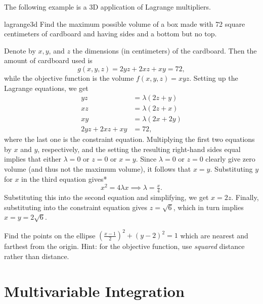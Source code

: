 \documentclass[svgnames]{watsonbook}
\begin{document}
  The following example is a 3D application of Lagrange multipliers. 
  
  \begin{example}{}{lagrange3d}
    Find the maximum possible volume of a box made with 72 square
    centimeters of cardboard and having sides and a bottom but no
    top. 
  \end{example}

  \begin{solution}
    Denote by $x,y$, and $z$ the dimensions (in centimeters) of the
    cardboard. Then the amount of cardboard used is
    \[
      g(x,y,z) = 2yz + 2xz + xy = 72, 
    \]
    while the objective function is the volume $f(x,y,z) =
    xyz$. Setting up the Lagrange equations, we get
    \begin{align*}
      yz &= \lambda(2z + y) \\
      xz &= \lambda(2z + x) \\
      xy &= \lambda(2x + 2y) \\
      2yz + 2xz + xy &= 72, 
    \end{align*}
    where the last one is the constraint equation. Multiplying the
    first two equations by $x$ and $y$, respectively, and the setting
    the resulting right-hand sides equal implies that either $\lambda
    = 0$ or $z= 0$ or  $x = y$. Since $\lambda = 0$ or $z = 0$ clearly
    give zero volume (and thus not the maximum volume), it follows
    that $x=y$. Substituting $y$ for $x$ in the third equation gives*
    \[
      x^2 = 4 \lambda x \implies \lambda = \tfrac{x}{4}. 
    \]
    Substituting this into the second equation and simplifying, we get
    $x = 2z$. Finally, substituting into the constraint equation gives
    $z = \sqrt{6}$, which in turn implies $x = y = 2\sqrt{6}$. 
  \end{solution}

  \begin{exercise}{}{}
    Find the points on the ellipse $\left(\frac{x - 1}{2}\right)^2 +
    (y-2)^2 = 1$ which are nearest and farthest from the origin. Hint:
    for the objective function, use \textit{squared} distance rather
    than distance. 
  \end{exercise}
  
  \chapter{Multivariable Integration}
\end{document}
